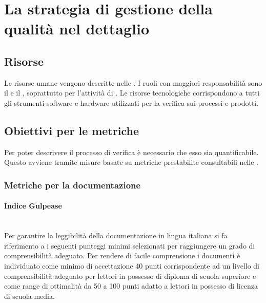 \section{La strategia di gestione della qualità nel dettaglio}

\subsection{Risorse}
Le risorse umane vengono descritte nelle \NormeDiProgetto{}. I ruoli con maggiori responsabilità sono il \Responsabile{} e il \Verificatore{}, soprattutto per l'attività di \VV{}.
Le risorse tecnologiche corrispondono a tutti gli strumenti software e hardware utilizzati per la verifica sui processi e prodotti.

\subsection{Obiettivi per le metriche}\label{sec:metriche}
Per poter descrivere il processo di verifica è necessario che esso sia quantificabile. Questo avviene tramite misure basate su metriche prestabilite consultabili nelle \NormeDiProgetto{}.

\subsubsection{Metriche per la documentazione}\label{sec:metriche_documentazione}
\paragraph{Indice Gulpease}\mbox{}\\
Per garantire la leggibilità della documentazione in lingua italiana si fa riferimento a i seguenti punteggi minimi selezionati per raggiungere un grado di comprensibilità adeguato. Per rendere di facile comprensione i documenti è individuato come minimo di accettazione 40 punti corrispondente ad un livello di comprensibilità adeguato per lettori in possesso di diploma di scuola superiore e come range di ottimalità da 50 a 100 punti adatto a lettori in possesso di licenza di scuola media.

